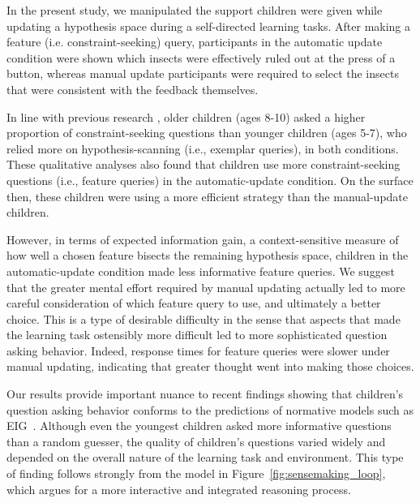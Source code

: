 \documentclass[man,floatsintext]{apa6}
\begin{document}
In the present study, we manipulated the support children were given while updating a hypothesis space
during a self-directed learning tasks.  After making a feature (i.e. constraint-seeking) query, participants in the 
automatic update condition were shown which insects were effectively ruled out at the press of 
a button, whereas manual update participants were required to select the insects that 
were consistent with the feedback themselves.

In line with previous research \cite{Mosher:1966,Ruggeri:2014}, older children (ages 8-10) asked a higher proportion of constraint-seeking questions than younger children (ages 5-7), who relied more on hypothesis-scanning (i.e., exemplar queries), in both conditions. These qualitative analyses also found that children use more constraint-seeking questions (i.e., feature queries) in the automatic-update condition. On the surface then, these children were using a more efficient strategy than the manual-update children. %

However, in terms of expected information gain, a context-sensitive measure of how well a chosen feature bisects the remaining hypothesis space, children in the automatic-update condition made less informative feature queries. 
We suggest that the greater mental effort required by manual updating actually led 
to more careful consideration of which feature query to use, and ultimately a better choice. This is a type of desirable difficulty in the sense that aspects that made the learning task ostensibly more difficult led to more sophisticated question asking behavior.  Indeed, response times for feature queries were slower under manual updating, indicating that greater thought went into making those choices.  

Our results provide important nuance to recent findings showing that children's question asking behavior conforms to the predictions of normative models such as EIG~\cite{Ruggeri:2015}. Although even the youngest children asked more informative questions than a random guesser, the quality of children's questions varied widely and depended on the overall nature of the learning task and environment.  
This type of finding follows strongly from the model in Figure~\ref{fig:sensemaking_loop},
which argues for a more interactive and integrated reasoning process.
\end{document}
